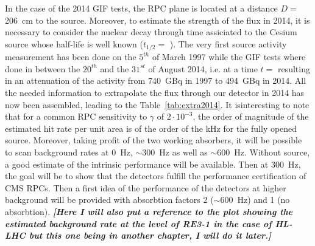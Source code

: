 			In the case of the 2014 GIF tests, the RPC plane is located at a distance $D=$\SI{206}{cm} to the source. Moreover, to estimate the strength of the flux in 2014, it is necessary to consider the nuclear decay through time assiciated to the Cesium source whose half-life is well known ($t_{1/2}=$ ). The very first source activity measurement has been done on the $5^{th}$ of March 1997 while the GIF tests where done in between the $20^{th}$ and the $31^{st}$ of August 2014, i.e. at a time $t=$  resulting in an attenuation of the activity from \SI{740}{GBq} in 1997 to \SI{494}{GBq} in 2014. All the needed information to extrapolate the flux through our detector in 2014 has now been assembled, leading to the Table~\ref{tab:extra2014}. It isinteresting to note that for a common RPC sensitivity to $\gamma$ of $2 \cdot 10^{-3}$, the order of magnitude of the estimated hit rate per unit area is of the order of the \si{kHz} for the fully opened source. Moreover, taking profit of the two working absorbers, it will be possible to scan background rates at \SI{0}{Hz}, $\sim$\SI{300}{Hz} as well as $\sim$\SI{600}{Hz}. Without source, a good estimate of the intrinsic performance will be available. Then at \SI{300}{Hz}, the goal will be to show that the detectors fulfill the performance certification of CMS RPCs. Then a first idea of the performance of the detectors at higher background will be provided with absorbtion factors 2 ($\sim$\SI{600}{Hz}) and 1 (no absorbtion). \textbf{\textit{[Here I will also put a reference to the plot showing the estimated background rate at the level of RE3-1 in the case of HL-LHC but this one being in another chapter, I will do it later.]}}
			
